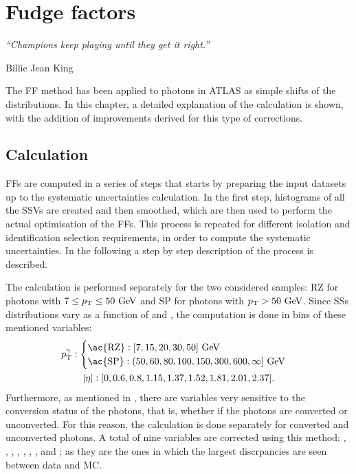 \chapter{Fudge factors}
\label{ch:ffs}
\epigraph{\emph{“Champions keep playing until they get it right.”}}{Billie Jean King}




The \ac{FF} method has been applied to photons in \ac{ATLAS} as simple shifts of the distributions. In this chapter, a detailed explanation of the calculation is shown, with the addition of improvements derived for this type of corrections.







\section{Calculation}

\acp{FF} are computed in a series of steps that starts by preparing the input datasets up to the systematic uncertainties calculation. In the first step, histograms of all the \acp{SSV} are created and then smoothed, which are then used to perform the actual optimisation of the \acp{FF}. This process is repeated for different isolation and identification selection requirements, in order to compute the systematic uncertainties. In the following a step by step description of the process is described.

The calculation is performed separately for the two considered samples: \ac{RZ} for photons with \(7\leq p_{\text{T}}\leq 50~\text{GeV}\) and \ac{SP} for photons with \(p_{\text{T}}> 50~\text{GeV}\). Since \acp{SS} distributions vary as a function of \pt and \abseta, the computation is done in bins of these mentioned variables:
\begin{gather}
    \ptgam:
    \begin{cases}
        \text{\ac{RZ}}: [7, 15, 20, 30, 50] ~\gev\\
        \text{\ac{SP}}: (50, 60, 80, 100, 150, 300, 600, \infty] ~\gev\\
    \end{cases}\\
    \abseta: [0, 0.6, 0.8, 1.15, 1.37, 1.52, 1.81, 2.01, 2.37].
\end{gather}
Furthermore, as mentioned in \Sect{\ref{sec:pid_ss:ss}}, there are variables very sensitive to the conversion status of the photons, that is, whether if the photons are converted or unconverted. For this reason, the calculation is done separately for converted and unconverted photons. A total of nine variables are corrected using this method: \eratio, \fside, \reta, \rphi, \rhad, \rhado, \wone, \weta and \wstot; as they are the ones in which the largest discrpancies are seen between data and \ac{MC}.

